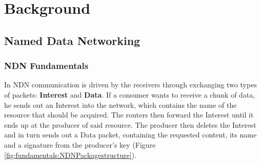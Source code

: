 \chapter{Background} \label{chapter:Background}



\section{Named Data Networking}

\subsection{NDN Fundamentals}


 In NDN communication is driven by the receivers through exchanging two types of packets: \textbf{Interest} and \textbf{Data}. If a consumer wants to receive a chunk of data, he sends out an Interest into the network, which contains the name of the resource that should be acquired. The routers then forward the Interest until it ends up at the producer of said resource. The producer then deletes the Interest and in turn sends out a Data packet, containing the requested content, its name and a signature from the producer's key (Figure \ref{fig:fundamentals:NDNPackagestructure}). 

